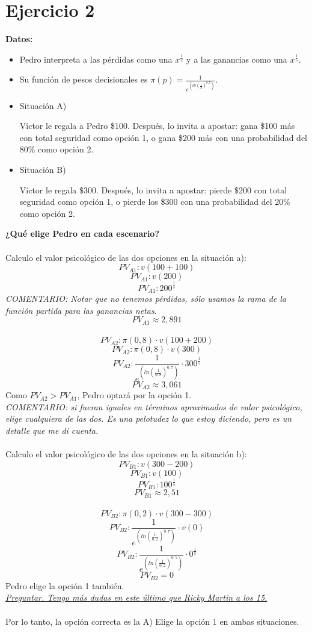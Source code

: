 \documentclass{article}
\newcommand{\ulcolor}[2][Red]{\setulcolor{#1}\ul{#2}}
\begin{document}
    \section*{Ejercicio 2}
        \textbf{Datos:}
        \begin{itemize}
            \item Pedro interpreta a las pérdidas como una \(x^{\frac{1}{2}}\) y a las ganancias como una \(x^{\frac{1}{5}}\).
            \item Su función de pesos decisionales es \(\pi(p) = \frac{1}{e^{(ln(\frac{1}{p})^{0,7})}}\).
            \item Situación A)

            Víctor le regala a Pedro \$100. Después, lo invita a apostar: gana \$100 más con total seguridad como opción 1, o gana \$200 más con una probabilidad del 80\% como opción 2.

            \item Situación B)

            Víctor le regala \$300. Después, lo invita a apostar: pierde \$200 con total seguridad como opción 1, o pierde los \$300 con una probabilidad del 20\% como opción 2.
        \end{itemize}
        \textbf{¿Qué elige Pedro en cada escenario?}
        \\
        \\
        Calculo el valor psicológico de las dos opciones en la situación a):
        \[PV_{A1}: v(100 + 100)\]
        \[PV_{A1}: v(200)\]
        \[PV_{A1}: 200^{\frac{1}{5}}\]
        \textit{COMENTARIO: Notar que no tenemos pérdidas, sólo usamos la rama de la función partida para las ganancias netas}.
        \[PV_{A1} \approx 2,891\]
        \\
        \[PV_{A2}: \pi(0,8) \cdot v(100 + 200)\]
        \[PV_{A2}: \pi(0,8) \cdot v(300)\]
        \[PV_{A2}: \frac{1}{e^{(ln(\frac{1}{0,8})^{0,7})}} \cdot 300^{\frac{1}{5}}\]
        \[PV_{A2} \approx 3,061\]
        Como \(PV_{A2} > PV_{A1}\), Pedro optará por la opción 1.
        \\
        \textit{COMENTARIO: si fueran iguales en términos aproximados de valor psicológico, elige cualquiera de las dos. Es una pelotudez lo que estoy diciendo, pero es un detalle que me di cuenta.}
        \\
        \\
        Calculo el valor psicológico de las dos opciones en la situación b):
        \[PV_{B1}: v(300 - 200)\]
        \[PV_{B1}: v(100)\]
        \[PV_{B1}: 100^{\frac{1}{5}}\]
        \[PV_{B1} \approx 2,51\]
        \\
        \[PV_{B2}: \pi(0,2) \cdot v(300 - 300)\]
        \[PV_{B2}: \frac{1}{e^{(ln(\frac{1}{0,2})^{0,7})}} \cdot v(0)\]
        \[PV_{B2}: \frac{1}{e^{(ln(\frac{1}{0,2})^{0,7})}} \cdot 0^{\frac{1}{5}}\]
        \[PV_{B2} = 0\]
        Pedro elige la opción 1 también.
        \\
        \textit{\ulcolor[red]{Preguntar. Tengo más dudas en este último que Ricky Martin a los 15.}}
        \\
        \\
        Por lo tanto, la opción correcta es la A) Elige la opción 1 en ambas situaciones.
\end{document}
